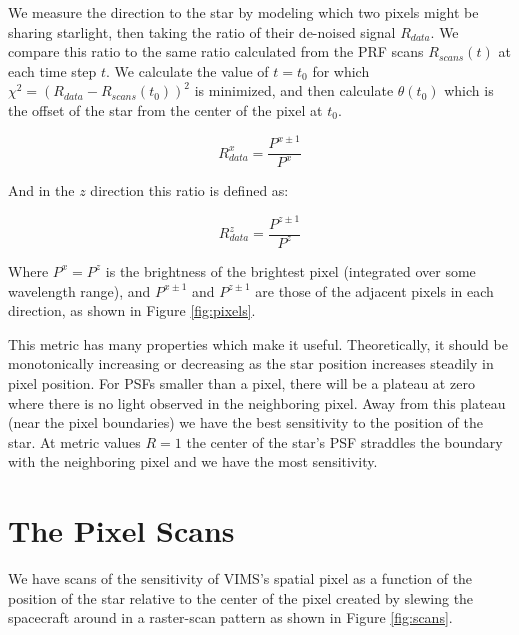 \documentclass[12pt]{article}
\begin{document}
We measure the direction to the star by modeling which two pixels might be
sharing starlight, then taking the ratio of their de-noised signal $R_{data}$.
We compare this ratio to the same ratio calculated from the PRF scans
$R_{scans}(t)$ at each time step $t$. We calculate the value of $t=t_0$ for
which $\chi^2 = (R_{data}-R_{scans}(t_0))^2$ is minimized, and then calculate
$\theta(t_0)$ which is the offset of the star from the center of the pixel at
$t_0$.

\begin{equation}
R_{data}^x = \frac{P^{x\pm1}}{P^{x}}
\end{equation}

And in the $z$ direction this ratio is defined as:

\begin{equation}
R_{data}^z = \frac{P^{z\pm1}}{P^{z}}
\end{equation}

Where $P^x = P^z$ is the brightness of the brightest pixel (integrated over
some wavelength range), and $P^{x\pm1}$ and $P^{z\pm1}$ are those of the
adjacent pixels in each direction, as shown in Figure \ref{fig:pixels}.

This metric has many properties which make it useful. Theoretically, it should
be monotonically increasing or decreasing as the star position increases
steadily in pixel position.  For PSFs smaller than a pixel, there will be a
plateau at zero where there is no light observed in the neighboring pixel. Away
from this plateau (near the pixel boundaries) we have the best sensitivity to
the position of the star. At metric values $R = 1$ the center of the star's PSF
straddles the boundary with the neighboring pixel and we have the most
sensitivity.

\section{The Pixel Scans}

We have scans of the sensitivity of VIMS's spatial pixel as a function of the
position of the star relative to the center of the pixel created by slewing the
spacecraft around in a raster-scan pattern as shown in Figure \ref{fig:scans}.
\end{document}
